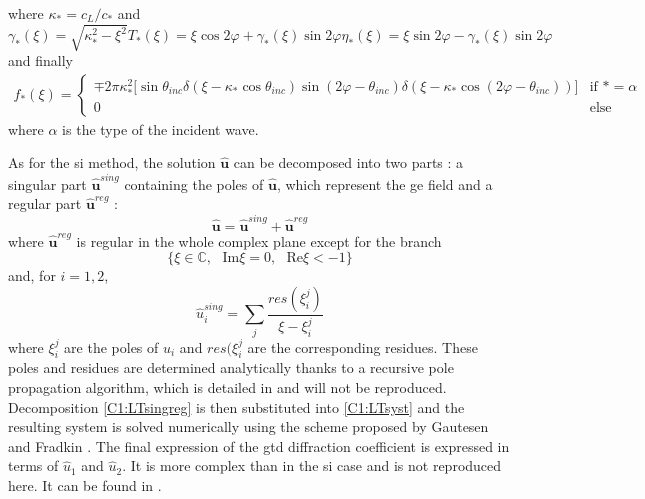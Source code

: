 where $\kappa_*=c_L/c_*$ and
\begin{subequations}
\begin{equation}
\gamma_*(\xi)=\sqrt{\kappa_*^2-\xi^2}
\end{equation}
\begin{equation}
T_*(\xi)=\xi\cos 2\varphi+\gamma_*(\xi)\sin 2\varphi
\end{equation}
\begin{equation}
\eta_*(\xi)=\xi\sin 2\varphi-\gamma_*(\xi)\sin 2\varphi
\end{equation}
\end{subequations}
and finally
\begin{eqnarray}
f_*(\xi)=\left\{
\begin{array}{cc}
\mp2\pi\kappa_*^2\lbrack \sin\theta_{inc}\delta(\xi-\kappa_*\cos\theta_{inc})\sin(2\varphi-\theta_{inc})\delta(\xi-\kappa_*\cos(2\varphi-\theta_{inc}))\rbrack & \mbox{if } *=\alpha \\
0&\mbox{else}
\end{array}
\right.
\end{eqnarray}
where $\alpha$ is the type of the incident wave.

As for the \acrshort{si} method, the solution $\hat{\mathbf{u}}$ can be decomposed into two parts : a singular part $\hat{\mathbf{u}}^{sing}$ containing the poles of $\hat{\mathbf{u}}$, which represent the \acrshort{ge} field and a regular part $\hat{\mathbf{u}}^{reg}$ :
\begin{equation}
\hat{\mathbf{u}}=\hat{\mathbf{u}}^{sing}+\hat{\mathbf{u}}^{reg}
\label{C1:LTsingreg}
\end{equation}
where $\hat{\mathbf{u}}^{reg}$ is regular in the whole complex plane except for the branch 
\begin{equation}
\{ \xi \in \mathbb{C}, \, \, \mbox{ Im} \xi=0, \, \, \mbox{ Re} \xi<-1 \}
\end{equation}
and, for $i=1,2$,
\begin{equation}
\hat{u}_i^{sing}=\sum_j \dfrac{res(\xi_i^j)}{\xi-\xi_i^j}
\end{equation}
where $\xi_i^j$ are the poles of $\hat{u}_i$ and $res(\xi_i^j$ are the corresponding residues. These poles and residues are determined analytically thanks to a recursive pole propagation algorithm, which is detailed in \cite{AKDthese} and will not be reproduced. Decomposition \eqref{C1:LTsingreg} is then substituted into \eqref{C1:LTsyst} and the resulting system is solved numerically using the scheme proposed by Gautesen and Fradkin \cite{GautesenFradkin}. The final expression of the \acrshort{gtd} diffraction coefficient is expressed in terms of $\hat{u}_1$ and $\hat{u}_2$. It is more complex than in the \acrshort{si} case and is not reproduced here. It can be found in \cite{GautesenFradkin}.

